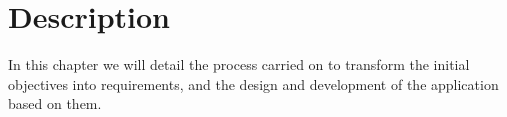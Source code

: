 \chapter{Description}
\label{chap:description}

In this chapter we will detail the process carried on to transform the
initial objectives into requirements, and the design and development of the
application based on them.


\clearpage


\clearpage


\clearpage


\clearpage


\clearpage


\clearpage


\clearpage


\clearpage
